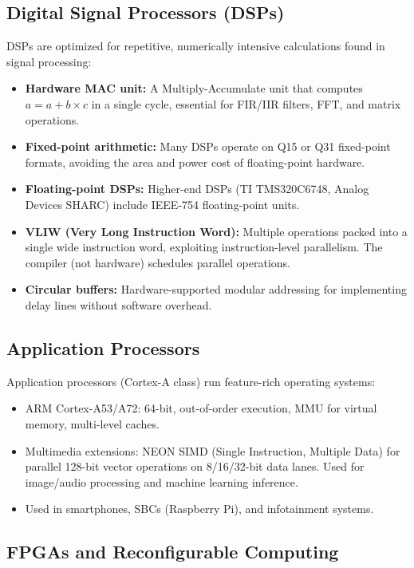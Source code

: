 \subsection{Digital Signal Processors (DSPs)}

DSPs are optimized for repetitive, numerically intensive calculations found in signal processing:

\begin{itemize}
  \item \textbf{Hardware MAC unit:} A Multiply-Accumulate unit that computes $a = a + b \times c$ in a single cycle, essential for FIR/IIR filters, FFT, and matrix operations.
  \item \textbf{Fixed-point arithmetic:} Many DSPs operate on Q15 or Q31 fixed-point formats, avoiding the area and power cost of floating-point hardware.
  \item \textbf{Floating-point DSPs:} Higher-end DSPs (TI TMS320C6748, Analog Devices SHARC) include IEEE-754 floating-point units.
  \item \textbf{VLIW (Very Long Instruction Word):} Multiple operations packed into a single wide instruction word, exploiting instruction-level parallelism. The compiler (not hardware) schedules parallel operations.
  \item \textbf{Circular buffers:} Hardware-supported modular addressing for implementing delay lines without software overhead.
\end{itemize}

\subsection{Application Processors}

Application processors (Cortex-A class) run feature-rich operating systems:
\begin{itemize}
  \item ARM Cortex-A53/A72: 64-bit, out-of-order execution, MMU for virtual memory, multi-level caches.
  \item Multimedia extensions: NEON SIMD (Single Instruction, Multiple Data) for parallel 128-bit vector operations on 8/16/32-bit data lanes. Used for image/audio processing and machine learning inference.
  \item Used in smartphones, SBCs (Raspberry Pi), and infotainment systems.
\end{itemize}

\subsection{FPGAs and Reconfigurable Computing}

